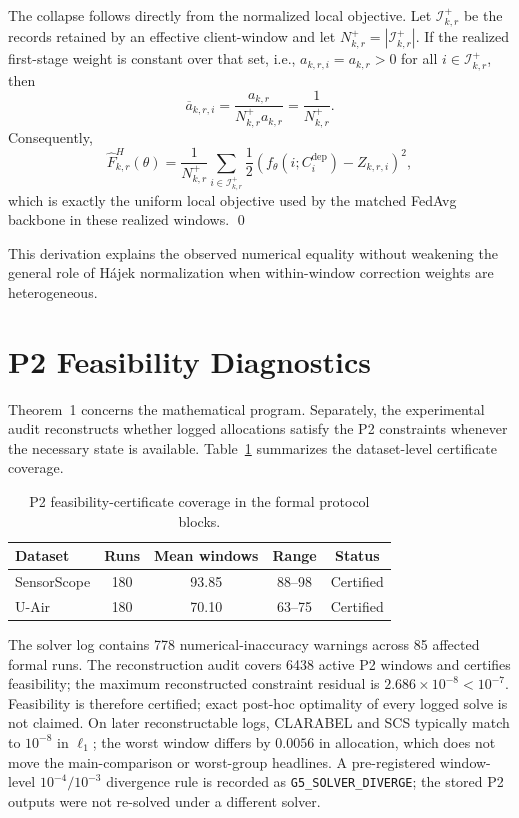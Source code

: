 The collapse follows directly from the normalized local objective.  Let
$\mathcal I_{k,r}^{+}$ be the records retained by an effective client-window
and let $N_{k,r}^{+}=|\mathcal I_{k,r}^{+}|$.  If the realized first-stage
weight is constant over that set, i.e.,
$a_{k,r,i}=a_{k,r}>0$ for all $i\in\mathcal I_{k,r}^{+}$, then
\begin{equation}
 \overline a_{k,r,i}
 =
 \frac{a_{k,r}}
 {N_{k,r}^{+}a_{k,r}}
 =
 \frac{1}{N_{k,r}^{+}}.
 \label{eq:app_local_hajek_uniform}
\end{equation}
Consequently,
\begin{equation}
 \widehat F^H_{k,r}(\theta)
 =
 \frac{1}{N_{k,r}^{+}}
 \sum_{i\in\mathcal I_{k,r}^{+}}
 \frac{1}{2}
 \left(
 f_\theta(i;C_i^{\mathrm{dep}})-Z_{k,r,i}
 \right)^2,
 \label{eq:app_local_hajek_collapse}
\end{equation}
which is exactly the uniform local objective used by the matched FedAvg
backbone in these realized windows.
\qed

This derivation explains the observed
numerical equality without weakening the general role of H\'ajek normalization
when within-window correction weights are heterogeneous.


\section{P2 Feasibility Diagnostics}
\label{app:p2_diagnostics}

Theorem~1 concerns the mathematical program.  Separately, the
experimental audit reconstructs whether logged allocations satisfy the P2
constraints whenever the necessary state is available.  Table~\ref{tab:app_p2_coverage}
summarizes the dataset-level certificate coverage.

\begin{table}[!t]
\centering
\caption{P2 feasibility-certificate coverage in the formal protocol blocks.}
\label{tab:app_p2_coverage}
\footnotesize
\setlength{\tabcolsep}{4pt}
\begin{tabular*}{\columnwidth}{@{\extracolsep{\fill}}lcccc}
\toprule
Dataset & Runs & Mean windows & Range & Status\\
\midrule
SensorScope & 180 & 93.85 & 88--98 & Certified \\
U-Air & 180 & 70.10 & 63--75 & Certified \\
\bottomrule
\end{tabular*}
\end{table}

The solver log contains 778 numerical-inaccuracy warnings across
85 affected formal runs.  The reconstruction audit covers
6438 active P2 windows and certifies feasibility; the maximum
reconstructed constraint residual is
$2.686\times10^{-8}<10^{-7}$.  Feasibility is therefore certified;
exact post-hoc optimality of every logged solve is not claimed.
On later reconstructable logs, CLARABEL and SCS typically match to
$10^{-8}$ in $\ell_1$; the worst window differs by $0.0056$ in
allocation, which does not move the main-comparison or worst-group
headlines.  A pre-registered window-level
$10^{-4}/10^{-3}$ divergence rule is recorded as
\texttt{G5\_SOLVER\_DIVERGE}; the stored P2 outputs were not re-solved under a different solver.

